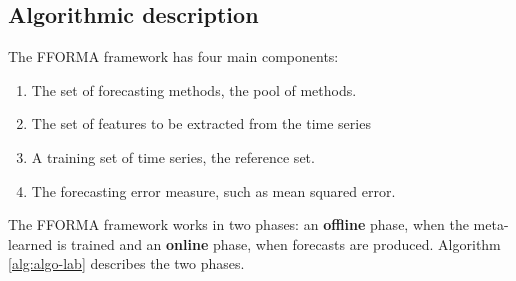 \documentclass[11pt,a4paper,]{article}
\providecommand{\tightlist}{%
  \setlength{\itemsep}{0pt}\setlength{\parskip}{0pt}}
\theoremstyle{definition}
\theoremstyle{definition}
\theoremstyle{definition}
\theoremstyle{remark}
\begin{document}
\subsection{Algorithmic description}\label{algorithmic-description}

The FFORMA framework has four main components:

\begin{enumerate}
\def\labelenumi{\arabic{enumi}.}
\tightlist
\item
  The set of forecasting methods, the pool of methods.
\item
  The set of features to be extracted from the time series
\item
  A training set of time series, the reference set.
\item
  The forecasting error measure, such as mean squared error.
\end{enumerate}

The FFORMA framework works in two phases: an \textbf{offline} phase,
when the meta-learned is trained and an \textbf{online} phase, when
forecasts are produced. Algorithm \ref{alg:algo-lab} describes the two
phases.
\end{document}

